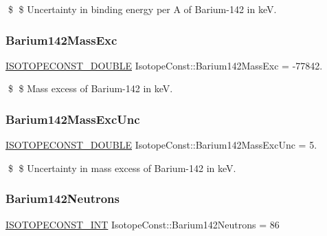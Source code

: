 \$ \$ Uncertainty in binding energy per A of Barium-\/142 in keV. \mbox{\label{group___isotope_const-_barium-_ba142_ga397bd0aa27e1ce1560732dabf1be90fa}} 
\subsubsection{\texorpdfstring{Barium142\+Mass\+Exc}{Barium142MassExc}}
{\footnotesize\ttfamily \mbox{\hyperlink{group___isotope_const-_macros_ga8f45a7272ce02c0b4c65c44636ed719a}{I\+S\+O\+T\+O\+P\+E\+C\+O\+N\+S\+T\+\_\+\+D\+O\+U\+B\+LE}} Isotope\+Const\+::\+Barium142\+Mass\+Exc = -\/77842.}

\$ \$ Mass excess of Barium-\/142 in keV. \mbox{\label{group___isotope_const-_barium-_ba142_gaecc135051191384714dc26a61ed8f09f}} 
\subsubsection{\texorpdfstring{Barium142\+Mass\+Exc\+Unc}{Barium142MassExcUnc}}
{\footnotesize\ttfamily \mbox{\hyperlink{group___isotope_const-_macros_ga8f45a7272ce02c0b4c65c44636ed719a}{I\+S\+O\+T\+O\+P\+E\+C\+O\+N\+S\+T\+\_\+\+D\+O\+U\+B\+LE}} Isotope\+Const\+::\+Barium142\+Mass\+Exc\+Unc = 5.}

\$ \$ Uncertainty in mass excess of Barium-\/142 in keV. \mbox{\label{group___isotope_const-_barium-_ba142_gad1356ca092812ff2c63635955790933d}} 
\subsubsection{\texorpdfstring{Barium142\+Neutrons}{Barium142Neutrons}}
{\footnotesize\ttfamily \mbox{\hyperlink{group___isotope_const-_macros_ga5f18360b3e99483a35c32d789e62621c}{I\+S\+O\+T\+O\+P\+E\+C\+O\+N\+S\+T\+\_\+\+I\+NT}} Isotope\+Const\+::\+Barium142\+Neutrons = 86}

